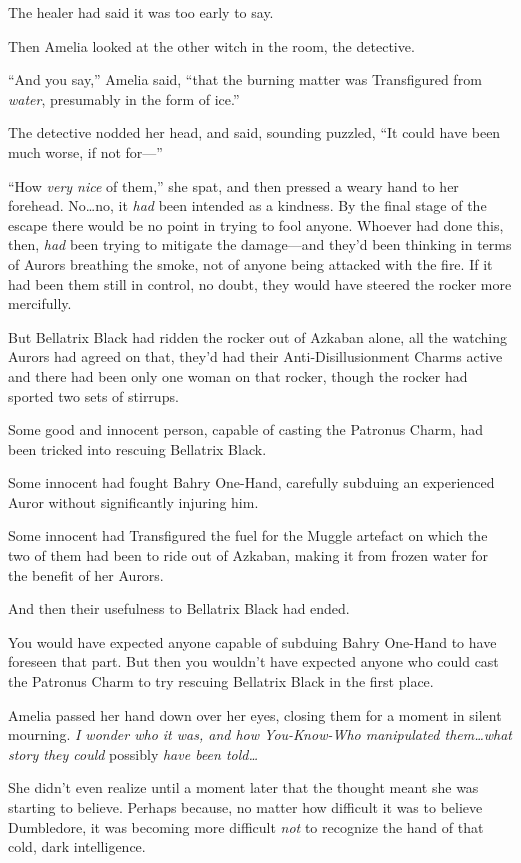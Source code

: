 The healer had said it was too early to say.

Then Amelia looked at the other witch in the room, the detective.

“And you say,” Amelia said, “that the burning matter was Transfigured from \emph{water}, presumably in the form of ice.”

The detective nodded her head, and said, sounding puzzled, “It could have been much worse, if not for—”

“How \emph{very nice} of them,” she spat, and then pressed a weary hand to her forehead. No…no, it \emph{had} been intended as a kindness. By the final stage of the escape there would be no point in trying to fool anyone. Whoever had done this, then, \emph{had} been trying to mitigate the damage—and they’d been thinking in terms of Aurors breathing the smoke, not of anyone being attacked with the fire. If it had been them still in control, no doubt, they would have steered the rocker more mercifully.

But Bellatrix Black had ridden the rocker out of Azkaban alone, all the watching Aurors had agreed on that, they’d had their Anti-Disillusionment Charms active and there had been only one woman on that rocker, though the rocker had sported two sets of stirrups.

Some good and innocent person, capable of casting the Patronus Charm, had been tricked into rescuing Bellatrix Black.

Some innocent had fought Bahry One-Hand, carefully subduing an experienced Auror without significantly injuring him.

Some innocent had Transfigured the fuel for the Muggle artefact on which the two of them had been to ride out of Azkaban, making it from frozen water for the benefit of her Aurors.

And then their usefulness to Bellatrix Black had ended.

You would have expected anyone capable of subduing Bahry One-Hand to have foreseen that part. But then you wouldn’t have expected anyone who could cast the Patronus Charm to try rescuing Bellatrix Black in the first place.

Amelia passed her hand down over her eyes, closing them for a moment in silent mourning. \emph{I wonder who it was, and how You-Know-Who manipulated them…what story they could} possibly \emph{have been told…}

She didn’t even realize until a moment later that the thought meant she was starting to believe. Perhaps because, no matter how difficult it was to believe Dumbledore, it was becoming more difficult \emph{not} to recognize the hand of that cold, dark intelligence.


